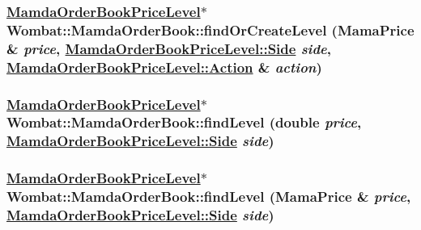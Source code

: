 \hypertarget{classWombat_1_1MamdaOrderBook_8b8e155566b1a641efa55ad65dadc659}{
\subsubsection[findOrCreateLevel]{\setlength{\rightskip}{0pt plus 5cm}\hyperlink{classWombat_1_1MamdaOrderBookPriceLevel}{Mamda\-Order\-Book\-Price\-Level}$\ast$ Wombat::Mamda\-Order\-Book::find\-Or\-Create\-Level (Mama\-Price \& {\em price}, \hyperlink{classWombat_1_1MamdaOrderBookPriceLevel_384c34b0a74d874b8969dee9b0d3718d}{Mamda\-Order\-Book\-Price\-Level::Side} {\em side}, \hyperlink{classWombat_1_1MamdaOrderBookPriceLevel_bd3407b4250fc6f7a42d94b6d32e358a}{Mamda\-Order\-Book\-Price\-Level::Action} \& {\em action})}}
\label{classWombat_1_1MamdaOrderBook_8b8e155566b1a641efa55ad65dadc659}


\hypertarget{classWombat_1_1MamdaOrderBook_430242ac5ee0f6d205db1fcb9e288721}{
\subsubsection[findLevel]{\setlength{\rightskip}{0pt plus 5cm}\hyperlink{classWombat_1_1MamdaOrderBookPriceLevel}{Mamda\-Order\-Book\-Price\-Level}$\ast$ Wombat::Mamda\-Order\-Book::find\-Level (double {\em price}, \hyperlink{classWombat_1_1MamdaOrderBookPriceLevel_384c34b0a74d874b8969dee9b0d3718d}{Mamda\-Order\-Book\-Price\-Level::Side} {\em side})}}
\label{classWombat_1_1MamdaOrderBook_430242ac5ee0f6d205db1fcb9e288721}


\hypertarget{classWombat_1_1MamdaOrderBook_074b3044e7a1bf090ae97b24398aa05d}{
\subsubsection[findLevel]{\setlength{\rightskip}{0pt plus 5cm}\hyperlink{classWombat_1_1MamdaOrderBookPriceLevel}{Mamda\-Order\-Book\-Price\-Level}$\ast$ Wombat::Mamda\-Order\-Book::find\-Level (Mama\-Price \& {\em price}, \hyperlink{classWombat_1_1MamdaOrderBookPriceLevel_384c34b0a74d874b8969dee9b0d3718d}{Mamda\-Order\-Book\-Price\-Level::Side} {\em side})}}
\label{classWombat_1_1MamdaOrderBook_074b3044e7a1bf090ae97b24398aa05d}


